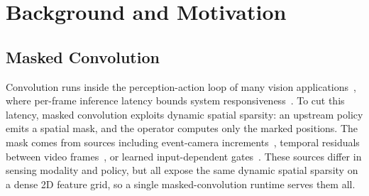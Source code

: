 \section{Background and Motivation}
\label{sec:background}

%
%
\subsection{Masked Convolution}
\label{sec:bg:masked}

Convolution runs inside the perception-action loop of many vision
applications~\cite{nanoflownet,fastdepth,bisenet,densefusion,contactgraspnet},
where per-frame inference latency bounds system
responsiveness~\cite{pampc,perclatency,eventavoid,dronerace}.
To cut this latency, masked convolution exploits dynamic spatial sparsity: an
upstream policy emits a spatial mask, and the operator computes only the marked
positions. The mask comes from sources including event-camera
increments~\cite{asyncsparse,evconv}, temporal residuals between video
frames~\cite{cbinfer,skipconv,deltacnn,motiondelta,sparsetem}, or learned input-dependent
gates~\cite{sact,sai,dgnet,dynconv}. These sources differ in sensing
modality and policy, but all expose the same dynamic spatial sparsity on a dense 2D
feature grid, so a single masked-convolution runtime serves them all.

